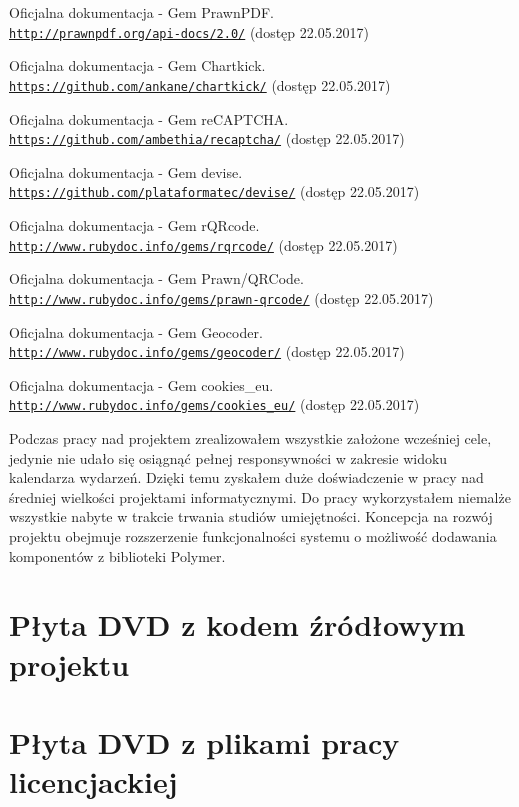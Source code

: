 \documentclass[openright]{xmgr}
\begin{document}
\begin{thebibliography}{9}
Oficjalna dokumentacja - Gem PrawnPDF.
\\\texttt{\url{http://prawnpdf.org/api-docs/2.0/}} (dostęp 22.05.2017)

Oficjalna dokumentacja - Gem Chartkick.
\\\texttt{\url{https://github.com/ankane/chartkick/}} (dostęp 22.05.2017)

Oficjalna dokumentacja - Gem reCAPTCHA.
\\\texttt{\url{https://github.com/ambethia/recaptcha/}} (dostęp 22.05.2017)

Oficjalna dokumentacja - Gem devise.
\\\texttt{\url{https://github.com/plataformatec/devise/}} (dostęp 22.05.2017)

Oficjalna dokumentacja - Gem rQRcode.
\\\texttt{\url{http://www.rubydoc.info/gems/rqrcode/}} (dostęp 22.05.2017)

Oficjalna dokumentacja - Gem Prawn/QRCode.
\\\texttt{\url{http://www.rubydoc.info/gems/prawn-qrcode/}} (dostęp 22.05.2017)

Oficjalna dokumentacja - Gem Geocoder.
\\\texttt{\url{http://www.rubydoc.info/gems/geocoder/}} (dostęp 22.05.2017)

Oficjalna dokumentacja - Gem cookies\_eu.
\\\texttt{\url{http://www.rubydoc.info/gems/cookies_eu/}} (dostęp 22.05.2017)

\end{thebibliography}


\summary
Podczas pracy nad projektem zrealizowałem wszystkie założone wcześniej cele, jedynie nie udało się osiągnąć pełnej responsywności w zakresie widoku kalendarza wydarzeń. Dzięki temu zyskałem duże doświadczenie w pracy nad średniej wielkości projektami informatycznymi. Do pracy wykorzystałem niemalże wszystkie nabyte w trakcie trwania studiów umiejętności. Koncepcja na rozwój projektu obejmuje rozszerzenie funkcjonalności systemu o możliwość dodawania komponentów z biblioteki Polymer.

\appendix
\chapter{Płyta DVD z kodem źródłowym projektu}



\chapter{Płyta DVD z plikami pracy licencjackiej}



\listoffigures

\lstlistoflistings
{}%

\oswiadczenie
\end{document}
